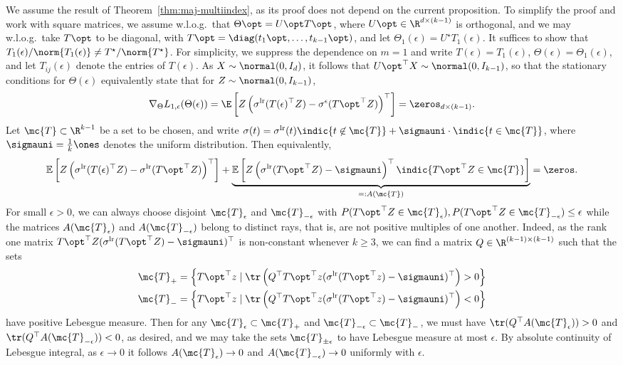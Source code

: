 \documentclass[11pt]{article}
\newcommand{\Ep}{\mathbb{E}}
\newcommand{\prn}[1]{\left({#1}\right)} %
\newcommand{\brk}[1]{\left[{#1}\right]} %
\newcommand{\lr}{^{\textup{lr}}}  %
\newcommand{\lre}{^{\epsilon}}  %
\begin{document}
We assume the result of Theorem~\ref{thm:maj-multiindex},
as its proof does not depend on the current proposition.
%
To simplify the proof and work with square matrices, we assume
w.l.o.g.\ that $\Theta\opt = U\opt T\opt$, where $U\opt \in \R^{d \times
  (k-1)}$ is orthogonal, and we may w.l.o.g.\ take $T\opt$ to be diagonal,
with $T\opt = \diag(t_1\opt, \ldots, t_{k-1}\opt)$, and let
$\Theta_1(\epsilon) = U^\star T_1(\epsilon)$.
%
It suffices to show that $T_1(\epsilon) / \norm{T_1(\epsilon)} \neq T^\star /
\norm{T^\star}$.
%
For simplicity, we suppress the dependence on $m = 1$ and
write $T(\epsilon) = T_1(\epsilon)$, $\Theta(\epsilon) =
\Theta_1(\epsilon)$, and let
$T_{ij}(\epsilon)$ denote the entries of $T(\epsilon)$.
%
As $X \sim \normal(0, I_d)$, it follows that ${U\opt}^\top X \sim \normal(0,
I_{k-1})$, so that the stationary conditions for $\Theta(\epsilon)$
equivalently state that for $Z \sim \normal(0, I_{k-1})$,
\begin{align*}
  \nabla_\Theta L_{1,\epsilon}(\Theta(\epsilon))
  = \E \brk{Z \prn{ \sigma\lr(T(\epsilon)^\top Z)
      - \sigma\lre({T\opt}^\top Z)}^\top} = \zeros_{d \times (k-1)}.
\end{align*}
Let $\mc{T} \subset \R^{k-1}$ be a set
to be chosen, and write
$\sigma (t) = \sigma\lr (t) \indic{t \not \in \mc{T}}
+ \sigmauni \cdot \indic{t \in \mc{T}}$,
where $\sigmauni = \frac{1}{k} \ones$ denotes the uniform distribution.
%
Then equivalently,
\begin{align*}
  \Ep \brk{Z \prn{ \sigma\lr(T(\epsilon)^\top Z)
      - \sigma\lr({T\opt}^\top Z)}^\top}
  + \underbrace{\Ep \brk{Z \prn{ \sigma\lr({T\opt}^\top Z)
        - \sigmauni}^\top \indic{{T\opt}^\top Z \in \mc{T}}}}_{
    =: A(\mc{T})} = \zeros.
\end{align*}
For small $\epsilon > 0$, we can always choose disjoint $\mc{T}_\epsilon$
and $\mc{T}_{-\epsilon}$ with $P({T\opt}^\top Z \in \mc{T}_\epsilon),
P({T\opt}^\top Z \in \mc{T}_{-\epsilon}) \le \epsilon$ while the matrices
$A(\mc{T}_\epsilon)$ and $A(\mc{T}_{-\epsilon})$ belong to distinct rays,
that is, are not positive multiples of one another.
%
Indeed, as the rank one matrix ${T\opt}^\top Z(\sigma\lr({T\opt}^\top Z) -
\sigmauni)^\top$ is non-constant whenever $k \geq 3$, we can find a matrix
$Q \in \R^{(k-1) \times (k-1)}$ such that the sets
\begin{align*}
  \mc{T}_+ & = \left\{{T\opt}^\top z \mid \tr\left(Q^\top
  {T\opt}^\top z (\sigma\lr({T\opt}^\top z) - \sigmauni)^\top\right)
  > 0 \right\} \\
  \mc{T}_- & = \left\{{T\opt}^\top z \mid \tr \left(Q^\top {T\opt}^\top z
  (\sigma\lr({T\opt}^\top z) - \sigmauni)^\top\right) < 0 \right\}
\end{align*}
have positive Lebesgue measure.
%
Then for any $\mc{T}_\epsilon \subset \mc{T}_+$ and $\mc{T}_{-\epsilon}
\subset \mc{T}_-$, we must have $\tr(Q^\top A(\mc{T}_\epsilon)) > 0$ and
$\tr(Q^\top A(\mc{T}_{-\epsilon})) < 0$, as desired, and we may take the
sets $\mc{T}_{\pm \epsilon}$ to have Lebesgue measure at most $\epsilon$.
%
By absolute continuity of Lebesgue integral, as $\epsilon \to 0$ it follows
$A(\mc{T}_\epsilon) \to 0$ and $A(\mc{T}_{-\epsilon}) \to 0$ uniformly with
$\epsilon$.
\end{document}
